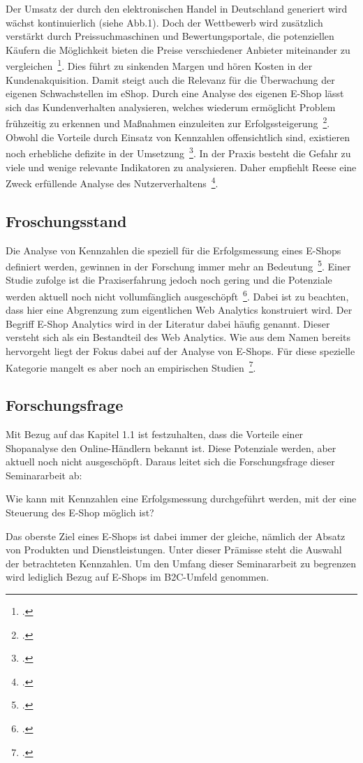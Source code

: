 Der Umsatz der durch den elektronischen Handel in Deutschland generiert wird wächst kontinuierlich (siehe Abb.1). Doch der Wettbewerb wird zusätzlich verstärkt durch Preissuchmaschinen und Bewertungsportale, die potenziellen Käufern die Möglichkeit bieten die Preise verschiedener Anbieter miteinander zu vergleichen~\footcite[Vgl. ]{website:welt:artikel}. Dies führt zu sinkenden Margen und hören Kosten in der Kundenakquisition. Damit steigt auch die Relevanz für die Überwachung der eigenen Schwachstellen im eShop. Durch eine Analyse des eigenen E-Shop lässt sich das Kundenverhalten analysieren, welches wiederum ermöglicht Problem frühzeitig zu erkennen und Maßnahmen einzuleiten zur Erfolgssteigerung~\footcite[Vgl. ][Seite 36-37]{Hassler.2010}. Obwohl die Vorteile durch Einsatz von Kennzahlen offensichtlich sind, existieren noch erhebliche defizite in der Umsetzung~\footcite[Vgl. ][Seite 3, 8, 10]{website:unifreiburg:webanalytics}. In der Praxis besteht die Gefahr zu viele und wenige relevante Indikatoren zu analysieren. Daher empfiehlt Reese eine Zweck erfüllende Analyse des Nutzerverhaltens~\footcite[Vgl. ][Seite 42]{Reese.2009}. 

\subsection{Froschungsstand}
Die Analyse von Kennzahlen die speziell für die Erfolgsmessung eines E-Shops definiert werden, gewinnen in der Forschung immer mehr an Bedeutung~\footcite[Vgl. ][Seite 1]{Hienerth.2010}. Einer Studie zufolge ist die Praxiserfahrung jedoch noch gering und die Potenziale werden aktuell noch nicht vollumfänglich ausgeschöpft~\footcite[Vgl. ][Seite 9, 15]{Zumstein.2011}. Dabei ist zu beachten, dass hier eine Abgrenzung zum eigentlichen Web Analytics konstruiert wird. Der Begriff E-Shop Analytics wird in der Literatur dabei häufig genannt. Dieser versteht sich als ein Bestandteil des Web Analytics. Wie aus dem Namen bereits hervorgeht liegt der Fokus dabei auf der Analyse von E-Shops. Für diese spezielle Kategorie mangelt es aber noch an empirischen Studien~\footcite[Vgl. ][Seite 5]{website:unifreiburg:webanalytics2}.

\subsection{Forschungsfrage}
Mit Bezug auf das Kapitel 1.1 ist festzuhalten, dass die Vorteile einer Shopanalyse den Online-Händlern bekannt ist. Diese Potenziale werden, aber aktuell noch nicht ausgeschöpft. Daraus leitet sich die Forschungsfrage dieser Seminararbeit ab:

Wie kann mit Kennzahlen eine Erfolgsmessung durchgeführt werden, mit der eine Steuerung des E-Shop möglich ist?

Das oberste Ziel eines E-Shops ist dabei immer der gleiche, nämlich der Absatz von Produkten und Dienstleistungen. Unter dieser Prämisse steht die Auswahl der betrachteten Kennzahlen. Um den Umfang dieser Seminararbeit zu begrenzen wird lediglich Bezug auf E-Shops im B2C-Umfeld genommen.

